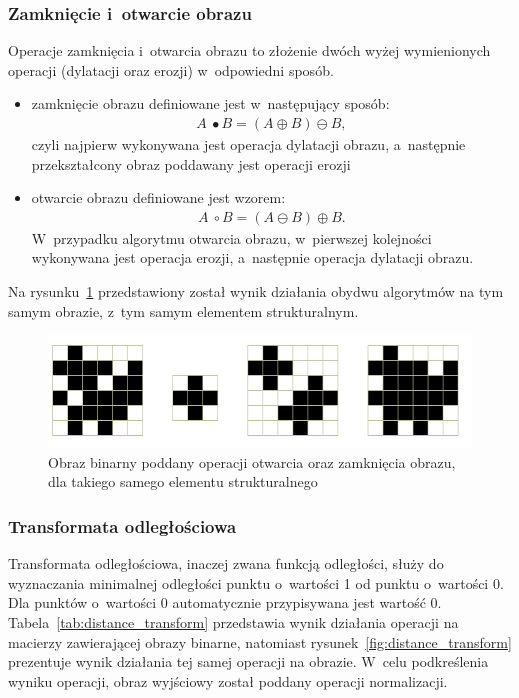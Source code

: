 \subsubsection{Zamknięcie i~otwarcie obrazu}
Operacje zamknięcia i~otwarcia obrazu to złożenie dwóch wyżej wymienionych operacji (dylatacji oraz erozji) w~odpowiedni sposób.
\begin{itemize}
\item zamknięcie obrazu definiowane jest w~następujący sposób:
  \begin{gather*}
 A~\bullet B = (A \oplus B) \ominus B,
  \end{gather*} 
czyli najpierw wykonywana jest operacja dylatacji obrazu, a~następnie przekształcony obraz poddawany jest operacji erozji
\item otwarcie obrazu definiowane jest wzorem:
  \begin{gather*}
 A~\circ B = (A \ominus B) \oplus B.
  \end{gather*}
 W~przypadku algorytmu otwarcia obrazu, w~pierwszej kolejności wykonywana jest operacja erozji, a~następnie operacja dylatacji obrazu.
\end{itemize}
Na rysunku~\ref{fig:open_close} przedstawiony został wynik działania obydwu algorytmów na tym samym obrazie, z~tym samym elementem strukturalnym.
\begin{figure}
  \centering
  \includegraphics[width=15cm]{img/open-close}
  \caption{Obraz binarny poddany operacji otwarcia oraz zamknięcia obrazu, dla takiego samego elementu strukturalnego}
  \label{fig:open_close}
\end{figure}
\subsubsection{Transformata odległościowa}
Transformata odległościowa, inaczej zwana funkcją odległości, służy do wyznaczania minimalnej odległości punktu o~wartości 1 od punktu o~wartości 0. Dla punktów o~wartości 0 automatycznie przypisywana jest wartość 0. \\
Tabela~\ref{tab:distance_transform} przedstawia wynik działania operacji na macierzy zawierającej obrazy binarne, natomiast rysunek~\ref{fig:distance_transform} prezentuje wynik działania tej samej operacji na obrazie. W~celu podkreślenia wyniku operacji, obraz wyjściowy został poddany operacji normalizacji.

